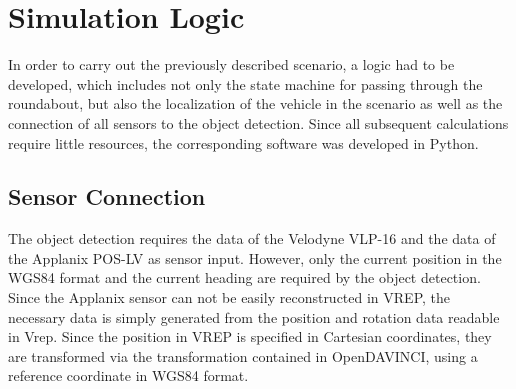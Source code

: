 \documentclass[11pt,oneside,openright]{mpreport}
\begin{document}
\section{Simulation Logic}


In order to carry out the previously described scenario, a logic had to be developed, which includes not only the state machine for passing through the roundabout,
but also the localization of the vehicle in the scenario as well as the connection of all sensors to the object detection.
Since all subsequent calculations require little resources, the corresponding software was developed in Python.

\subsection{Sensor Connection}
The object detection requires the data of the Velodyne VLP-16 and the data of the Applanix POS-LV as sensor input.
However, only the current position in the WGS84 format and the current heading are required by the object detection.
Since the Applanix sensor can not be easily reconstructed in VREP, the necessary data is simply generated from the position and rotation data readable in Vrep.
Since the position in VREP is specified in Cartesian coordinates, they are transformed via the transformation contained in OpenDAVINCI, using a reference coordinate in WGS84 format.
\end{document}
